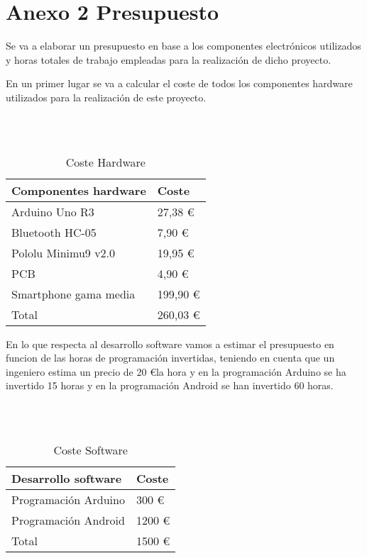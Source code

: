 \chapter*{Anexo 2 Presupuesto} %
	
	Se va a elaborar un presupuesto en base a los componentes electrónicos utilizados y horas totales de trabajo empleadas para la realización de dicho proyecto.
	
	En un primer lugar se va a calcular el coste de todos los componentes hardware utilizados para la realización de este proyecto.
	
	\
	\\
	\
	
	\begin{table}[H]
		\centering
		\begin{tabular}{p{5cm} p{5cm}}
			Componentes hardware & Coste \\
			\hline \hline
			Arduino Uno R3 & 27,38 \euro \\
			\hline
			Bluetooth HC-05 & 7,90 \euro \\
			\hline
			Pololu Minimu9 v2.0 & 19,95 \euro \\
			\hline
			PCB & 4,90 \euro \\
			\hline
			Smartphone gama media & 199,90 \euro \\
			\hline \hline
			Total & 260,03 \euro \\
			\hline
		\end{tabular}
		\caption{Coste Hardware}
		\label{tabla:LibreriasMota}
	\end{table}
	
	En lo que respecta al desarrollo software vamos a estimar el presupuesto en funcion de las horas de programación invertidas, teniendo en cuenta que un ingeniero estima un precio de 20 \euro  la hora y en la programación Arduino se ha invertido 15 horas y en la programación Android se han invertido 60 horas.
	
	\
	\\
	\
	
	\begin{table}[H]
		\centering
		\begin{tabular}{p{6cm} p{5cm}}
			Desarrollo software & Coste \\
			\hline \hline
			Programación Arduino & 300 \euro \\
			\hline
			Programación Android & 1200 \euro \\
			\hline \hline
			Total & 1500 \euro \\
			\hline
		\end{tabular}
		\caption{Coste Software}
		\label{tabla:LibreriasMota}
	\end{table}
	
